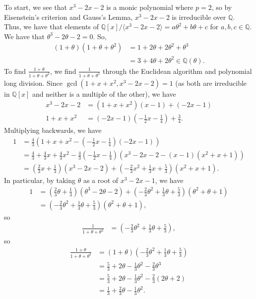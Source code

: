 \documentclass[11pt]{extarticle}
\newcommand{\Q}{\mathbb{Q}}
\begin{document}
  To start, we see that $x^3 - 2x - 2$ is a monic polynomial where $p = 2$, so by Eisenstein's criterion and Gauss's Lemma, $x^3 - 2x - 2$ is irreducible over $\Q$. Thus, we have that elements of $\Q[x]/\langle x^3 - 2x - 2\rangle = a\theta^2 + b\theta + c$ for $a,b,c\in \Q$.\\

  We have that $\theta^3 - 2\theta - 2 = 0$. So,
  \begin{align*}
    (1+\theta)(1+\theta + \theta^2) &= 1 + 2\theta + 2\theta^2 + \theta^3\\
                                    &= 3 + 4\theta + 2\theta^2 \in \Q(\theta).
  \end{align*}
  To find $\frac{1+\theta}{1+\theta+\theta^2}$, we find $\frac{1}{1+\theta+\theta^2}$ through the Euclidean algorithm and polynomial long division. Since $\gcd(1+x+x^2,x^3-2x-2) = 1$ (as both are irreducible in $\Q[x]$ and neither is a multiple of the other), we have
  \begin{align*}
    x^3 - 2x - 2 &= (1+x+x^2)(x-1) + (-2x-1)\\
    1+x+x^2 &= (-2x-1)\left(-\frac{1}{2}x - \frac{1}{4}\right) + \frac{3}{4}.
  \end{align*}
  Multiplying backwards, we have
  \begin{align*}
    1 &= \frac{4}{3}\left(1+x+x^2 -\left(-\frac{1}{2}x - \frac{1}{4}\right)(-2x-1)\right)\\
      &= \frac{4}{3} + \frac{4}{3}x + \frac{4}{3}x^2 - \frac{4}{3}\left(-\frac{1}{2}x - \frac{1}{4}\right)\left(x^3 - 2x - 2 - (x-1)(x^2 + x + 1)\right)\\
      &= \left(\frac{2}{3}x + \frac{1}{3}\right)\left(x^3-2x-2\right) + \left(-\frac{2}{3}x^2 + \frac{1}{3}x + \frac{5}{3}\right)\left(x^2 + x + 1\right).
  \end{align*}
  In particular, by taking $\theta$ as a root of $x^3 -2x -1$, we have
  \begin{align*}
    1 &= \left(\frac{2}{3}\theta + \frac{1}{3}\right)\left(\theta^3-2\theta-2\right) + \left(-\frac{2}{3}\theta^2 + \frac{1}{3}\theta + \frac{5}{3}\right)\left(\theta^2 + \theta + 1\right)\\
      &= \left(-\frac{2}{3}\theta^2 + \frac{1}{3}\theta + \frac{5}{3}\right)\left(\theta^2 + \theta + 1\right),
  \end{align*}
  so
  \begin{align*}
    \frac{1}{1+\theta + \theta^2} &= \left(-\frac{2}{3}\theta^2 + \frac{1}{3}\theta + \frac{5}{3}\right),
  \end{align*}
  so
  \begin{align*}
    \frac{1+\theta}{1+\theta+\theta^2} &= (1+\theta)\left(-\frac{2}{3}\theta^2 + \frac{1}{3}\theta + \frac{5}{3}\right)\\
                                       &= \frac{5}{3} + 2\theta - \frac{1}{3}\theta^2 - \frac{2}{3}\theta^3\\
                                       &= \frac{5}{3} + 2\theta - \frac{1}{3}\theta^2 - \frac{2}{3}\left(2\theta + 2\right)\\
                                       &= \frac{1}{3} + \frac{2}{3}\theta - \frac{1}{3}\theta^2.
  \end{align*}
\end{document}
